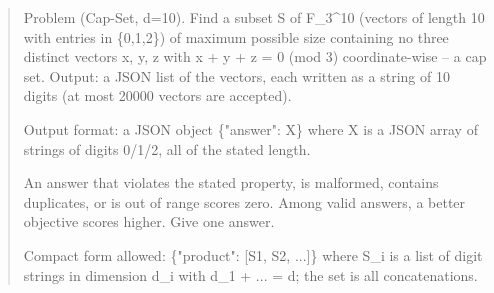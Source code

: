 \begin{quote}\small\ttfamily\raggedright Problem (Cap-Set, d=10). Find a subset S of F\_3\^{}10 (vectors of length 10 with entries in \{0,1,2\}) of maximum possible size containing no three distinct vectors x, y, z with x + y + z = 0 (mod 3) coordinate-wise -- a cap set. Output: a JSON list of the vectors, each written as a string of 10 digits (at most 20000 vectors are accepted).\par Output format: a JSON object \{"answer": X\} where X is a JSON array of strings of digits 0/1/2, all of the stated length.\par An answer that violates the stated property, is malformed, contains duplicates, or is out of range scores zero. Among valid answers, a better objective scores higher. Give one answer.\par Compact form allowed: \{"product": [S1, S2, ...]\} where S\_i is a list of digit strings in dimension d\_i with d\_1 + ... = d; the set is all concatenations.\end{quote}

